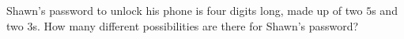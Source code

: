 Shawn's password to unlock his phone is four digits long, made up of two $5$s and two $3$s. How many different possibilities are there for Shawn's password?
